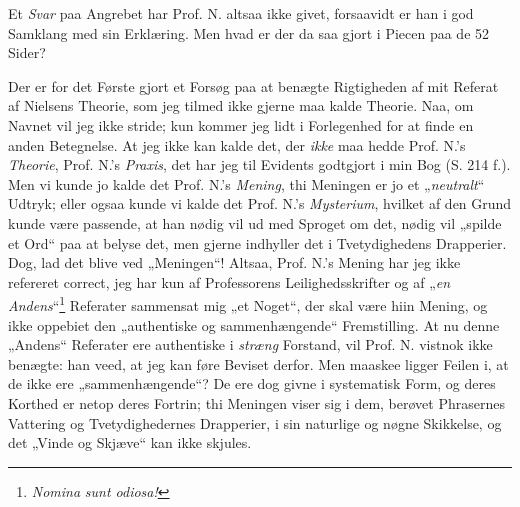 \documentclass[12pt,a4paper]{book}
\newcommand{\opage}[1]{\marginnote{\footnotesize\textit{[#1]}}}
\begin{document}
Et \emph{Svar} paa Angrebet har Prof. N. altsaa ikke givet, forsaavidt er han i
god Samklang med sin Erklæring. Men hvad er der da saa gjort i Piecen paa de 52
Sider?

Der er for det Første gjort et Forsøg paa at benægte Rigtigheden af mit Referat
af Nielsens Theorie, som jeg tilmed ikke gjerne maa kalde Theorie. Naa, om
Navnet vil jeg ikke stride; kun kommer jeg lidt i Forlegenhed for at finde en
anden Betegnelse. At jeg ikke kan kalde det, der \emph{ikke} maa hedde Prof.
N.'s \emph{Theorie}, Prof. N.'s \emph{Praxis}, det har jeg til Evidents
godtgjort i min Bog (S. 214 f.). Men vi kunde jo kalde det Prof. N.'s
\emph{Mening}, thi Meningen er jo et „\emph{neutralt}“ Udtryk; eller ogsaa kunde
vi kalde det Prof. N.'s \emph{Mysterium}, hvilket af den Grund kunde være
passende, at han nødig vil ud med Sproget om det, nødig vil „spilde et Ord“ paa
at belyse det, men gjerne indhyller det i Tvetydighedens Drapperier. Dog, lad
det blive ved „Meningen“! Altsaa, Prof. N.'s Mening har jeg ikke refereret
correct, jeg har kun af Professorens Leilighedsskrifter og af
„\emph{en Andens}“\footnote{%
  \emph{\textit{Nomina}} \textit{sunt odiosa!}}
Referater sammensat mig „et Noget“, der skal være hiin Mening, og ikke oppebiet
den „authentiske og sammenhængende“ Fremstilling. At nu denne „Andens“ Referater
ere authentiske i \emph{stræng} Forstand, vil Prof. N. vistnok ikke benægte: han
veed, at jeg
\opage{6} \setcounter{footnote}{0}%
kan føre Beviset derfor. Men maaskee ligger Feilen i, at de ikke ere
„sammenhængende“? De ere dog givne i systematisk Form, og deres Korthed er netop
deres Fortrin; thi Meningen viser sig i dem, berøvet Phrasernes Vattering og
Tvetydighedernes Drapperier, i sin naturlige og nøgne Skikkelse, og det „Vinde
og Skjæve“ kan ikke skjules.
\end{document}
